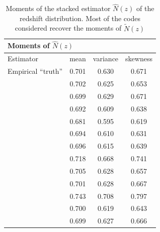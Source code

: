 \begin{table}
	\begin{center}
		\setlength{\tabcolsep}{2pt}
		\caption[Moments of the stacked estimator $\hat{N}(z)$ of the redshift distribution for the codes of ]
		{Moments of the stacked estimator $\hat{N}(z)$ of the redshift distribution.
			Most of the codes considered recover the moments of $\tilde{N}(z)$}
		\begin{tabular}{lccc}
			\hline
			\hline
			\multicolumn{4}{l}{Moments of $\hat{N}(z)$} \\
			\hline
			Estimator  & mean       & variance    & skewness \\
			Empirical ``truth'' & 0.701 & 0.630 & 0.671  \\
			\hline
			\annz       & 0.702      & 0.625      & 0.653    \\
			\bpz        & 0.699      & 0.629      & 0.671    \\
			\delight    & 0.692      & 0.609      & 0.638    \\
			\eazy       & 0.681      & 0.595      & 0.619    \\
			\flexzboost & 0.694      & 0.610      & 0.631    \\
			\gpz        & 0.696      & 0.615      & 0.639    \\
			\lephare    & 0.718      & 0.668      & 0.741    \\
			\metaphor   & 0.705      & 0.628      & 0.657    \\
			\cmnn       & 0.701      & 0.628      & 0.667    \\
			\skynet     & 0.743      & 0.708      & 0.797    \\
			\tpz        & 0.700      & 0.619      & 0.643    \\
			\hline
			\trainz	    & 0.699 		 & 0.627 	    & 0.666 \\
		\end{tabular}
	\end{center}
\end{table}


